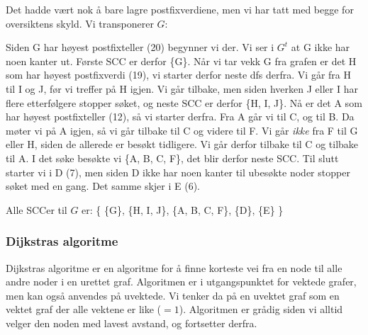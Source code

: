\begin{eks}
\noindent Det hadde vært nok å bare lagre postfixverdiene, men vi har tatt med begge for oversiktens skyld. Vi transponerer $ G $:

\begin{figure}[H]
\centering
{}
\end{figure}

Siden G har høyest postfixteller (20) begynner vi der. Vi ser i $ G^t $ at G ikke har noen kanter ut. Første SCC er derfor \{G\}. Når vi tar vekk G fra grafen er det H som har høyest postfixverdi (19), vi starter derfor neste dfs derfra. Vi går fra H til I og J, før vi treffer på H igjen. Vi går tilbake, men siden hverken J eller I har flere etterfølgere stopper søket, og neste SCC er derfor \{H, I, J\}. Nå er det A som har høyest postfixteller (12), så vi starter derfra. Fra A går vi til C, og til B. Da møter vi på A igjen, så vi går tilbake til C og videre til F. Vi går \emph{ikke} fra F til G eller H, siden de allerede er besøkt tidligere. Vi går derfor tilbake til C og tilbake til A. I det søke besøkte vi \{A, B, C, F\}, det blir derfor neste SCC. Til slutt starter vi i D (7), men siden D ikke har noen kanter til ubesøkte noder stopper søket med en gang. Det samme skjer i E (6). 

Alle SCCer til $ G $ er: \{ \{G\}, \{H, I, J\}, \{A, B, C, F\}, \{D\}, \{E\} \}
\end{eks}

\subsubsection{Dijkstras algoritme}
\label{dijkstra}

Dijkstras algoritme er en algoritme for å finne korteste vei fra en node til alle andre noder i en urettet graf. Algoritmen er i utgangspunktet for vektede grafer, men kan også anvendes på uvektede. Vi tenker da på en uvektet graf som en vektet graf der alle vektene er like ($ =1 $). Algoritmen er grådig siden vi alltid velger den noden med lavest avstand, og fortsetter derfra. 

